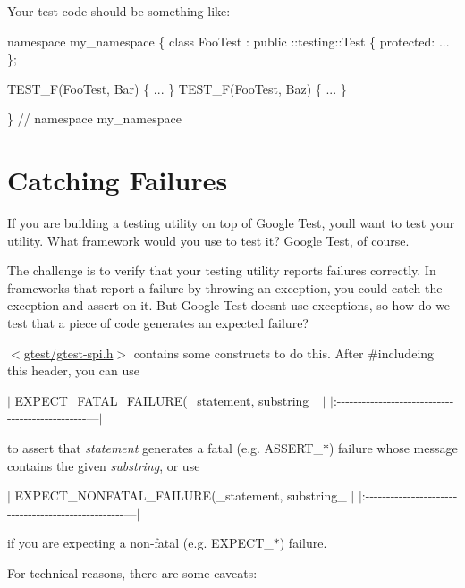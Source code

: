 Your test code should be something like\+:


\begin{DoxyCode}
namespace my\_namespace \{
class FooTest : public ::testing::Test \{
 protected:
  ...
\};

TEST\_F(FooTest, Bar) \{ ... \}
TEST\_F(FooTest, Baz) \{ ... \}

\}  // namespace my\_namespace
\end{DoxyCode}


\section*{Catching Failures}

If you are building a testing utility on top of Google Test, you\textquotesingle{}ll want to test your utility. What framework would you use to test it? Google Test, of course.

The challenge is to verify that your testing utility reports failures correctly. In frameworks that report a failure by throwing an exception, you could catch the exception and assert on it. But Google Test doesn\textquotesingle{}t use exceptions, so how do we test that a piece of code generates an expected failure?

{\ttfamily $<$\hyperlink{gtest-spi_8h_source}{gtest/gtest-\/spi.\+h}$>$} contains some constructs to do this. After {\ttfamily \#include}ing this header, you can use

$\vert$ {\ttfamily E\+X\+P\+E\+C\+T\+\_\+\+F\+A\+T\+A\+L\+\_\+\+F\+A\+I\+L\+U\+RE(}\+\_\+statement, substring\+\_\+{\ttfamily );} $\vert$ $\vert$\+:-\/-\/-\/-\/-\/-\/-\/-\/-\/-\/-\/-\/-\/-\/-\/-\/-\/-\/-\/-\/-\/-\/-\/-\/-\/-\/-\/-\/-\/-\/-\/-\/-\/-\/-\/-\/-\/-\/-\/-\/-\/-\/-\/-\/-\/-\/-\/---$\vert$

to assert that {\itshape statement} generates a fatal (e.\+g. {\ttfamily A\+S\+S\+E\+R\+T\+\_\+$\ast$}) failure whose message contains the given {\itshape substring}, or use

$\vert$ {\ttfamily E\+X\+P\+E\+C\+T\+\_\+\+N\+O\+N\+F\+A\+T\+A\+L\+\_\+\+F\+A\+I\+L\+U\+RE(}\+\_\+statement, substring\+\_\+{\ttfamily );} $\vert$ $\vert$\+:-\/-\/-\/-\/-\/-\/-\/-\/-\/-\/-\/-\/-\/-\/-\/-\/-\/-\/-\/-\/-\/-\/-\/-\/-\/-\/-\/-\/-\/-\/-\/-\/-\/-\/-\/-\/-\/-\/-\/-\/-\/-\/-\/-\/-\/-\/-\/-\/-\/-\/---$\vert$

if you are expecting a non-\/fatal (e.\+g. {\ttfamily E\+X\+P\+E\+C\+T\+\_\+$\ast$}) failure.

For technical reasons, there are some caveats\+:


